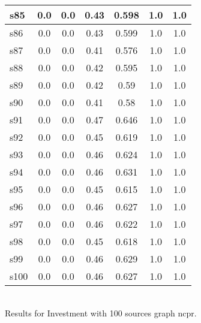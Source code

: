 \documentclass{article}
\begin{document}
\begin{tabular}{|l|c|c|c|c|c|c|}
\hline
s85 &0.0 & 0.0 & 0.43 & 0.598 & 1.0 & 1.0\\
\hline
s86 &0.0 & 0.0 & 0.43 & 0.599 & 1.0 & 1.0\\
\hline
s87 &0.0 & 0.0 & 0.41 & 0.576 & 1.0 & 1.0\\
\hline
s88 &0.0 & 0.0 & 0.42 & 0.595 & 1.0 & 1.0\\
\hline
s89 &0.0 & 0.0 & 0.42 & 0.59 & 1.0 & 1.0\\
\hline
s90 &0.0 & 0.0 & 0.41 & 0.58 & 1.0 & 1.0\\
\hline
s91 &0.0 & 0.0 & 0.47 & 0.646 & 1.0 & 1.0\\
\hline
s92 &0.0 & 0.0 & 0.45 & 0.619 & 1.0 & 1.0\\
\hline
s93 &0.0 & 0.0 & 0.46 & 0.624 & 1.0 & 1.0\\
\hline
s94 &0.0 & 0.0 & 0.46 & 0.631 & 1.0 & 1.0\\
\hline
s95 &0.0 & 0.0 & 0.45 & 0.615 & 1.0 & 1.0\\
\hline
s96 &0.0 & 0.0 & 0.46 & 0.627 & 1.0 & 1.0\\
\hline
s97 &0.0 & 0.0 & 0.46 & 0.622 & 1.0 & 1.0\\
\hline
s98 &0.0 & 0.0 & 0.45 & 0.618 & 1.0 & 1.0\\
\hline
s99 &0.0 & 0.0 & 0.46 & 0.629 & 1.0 & 1.0\\
\hline
s100 &0.0 & 0.0 & 0.46 & 0.627 & 1.0 & 1.0\\
\hline
\end{tabular}\\

\noindent Results for Investment with 100 sources graph ncpr.
\end{document}
